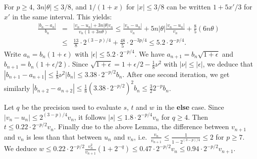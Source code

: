 \documentclass[12pt]{amsart}
\begin{document}
For $p \geq 4$, $3n |\theta| \leq 3/8$, and $1/(1+x)$ for $|x| \leq 3/8$
can be written $1+5x'/3$ for $x'$ in the same interval. This yields:
\begin{eqnarray*}
 \frac{|b_n-a_n|}{b_n}
   &=& \frac{|v_n-u_n| + 3n |\theta| v_n}{v_n (1+3n\theta)}
   \leq \frac{|v_n-u_n|}{v_n} + 5n|\theta| \frac{|v_n-u_n|}{v_n}
      + \frac{8}{5} (6n\theta) \\
   &\leq& \frac{13}{8} \cdot 2^{(3-p)/4} + \frac{48}{5} \cdot 2^{-3p/4}
   \leq 5.2 \cdot 2^{-p/4}.
\end{eqnarray*}
Write $a_n = b_n (1+\epsilon)$ with $|\epsilon| \leq 5.2 \cdot 2^{-p/4}$.
We have $a_{n+1} = b_n \sqrt{1+\epsilon}$ and $b_{n+1} = b_n (1+\epsilon/2)$.
Since $\sqrt{1+\epsilon} = 1 + \epsilon/2 - \frac{1}{8} \nu^2$ with
$|\nu| \leq |\epsilon|$, we deduce that
$|b_{n+1} - a_{n+1}| \leq \frac{1}{8} \nu^2 |b_n| \leq 3.38 \cdot 2^{-p/2}b_n$.
After one second iteration, we get similarly
$|b_{n+2} - a_{n+2}| \leq \frac{1}{8} (3.38 \cdot 2^{-p/2})^2 b_n
\leq \frac{3}{2} 2^{-p} b_n$.

Let $q$ be the precision used to evaluate $s$, $t$ and $w$ in the
{\bf else} case.
Since $|v_n - u_n| \leq 2^{(3-p)/4} v_n$, it follows
$|s| \leq 1.8 \cdot 2^{-p/4} v_n$ for $q \geq 4$.
Then $t \leq 0.22 \cdot 2^{-p/2} v_n$.
Finally due to the above Lemma, the difference between $v_{n+1}$ and $v_n$
is less than that between $u_n$ and $v_n$,
i.e.\ $\frac{v_n}{v_{n+1}} \leq \frac{1}{1-2^{(3-p)/4}} \leq 2$ for $p \geq 7$.
We deduce $w \leq 0.22 \cdot 2^{-p/2} \frac{v_n^2}{v_{n+1}} (1+2^{-q})
\leq 0.47 \cdot 2^{-p/2} v_n \leq 0.94 \cdot 2^{-p/2} v_{n+1}$.
\end{document}
